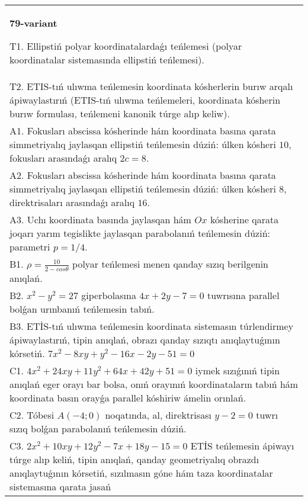 \documentclass{article}
\begin{document}
\begin{tabular}{m{17cm}}
\textbf{79-variant}
\newline

T1. Ellipstiń polyar koordinatalardaǵı teńlemesi (polyar koordinatalar sistemasında ellipstiń teńlemesi).\\

T2. ETIS-tıń ulıwma teńlemesin koordinata kósherlerin burıw arqalı ápiwaylastırıń (ETIS-tıń ulıwma teńlemeleri, koordinata kósherin burıw formulası, teńlemeni kanonik túrge alıp keliw).\\

A1. Fokusları abscissa kósherinde hám koordinata basına qarata simmetriyalıq jaylasqan ellipstiń teńlemesin dúziń: úlken kósheri $10$, fokusları arasındaǵı aralıq $2 c=8$.\\

A2. Fokusları abscissa kósherinde hám koordinata basına qarata simmetriyalıq jaylasqan ellipstiń teńlemesin dúziń: úlken kósheri $8$, direktrisaları arasındaǵı aralıq $16$.\\

A3. Uchı koordinata basında jaylasqan hám $Ox$ kósherine qarata joqarı yarım tegislikte jaylasqan parabolanıń teńlemesin dúziń: parametri $p=1/4$.\\

B1. $\rho = \frac{10}{2 - cos\theta}$ polyar teńlemesi menen qanday sızıq berilgenin anıqlań.  \\

B2. $x^{2} - y^{2} = 27$ giperbolasına $4x + 2y - 7 = 0$ tuwrısına parallel bolǵan urınbanıń teńlemesin tabıń.  \\

B3. ETİS-tıń ulıwma teńlemesin koordinata sistemasın túrlendirmey ápiwaylastırıń, tipin anıqlań, obrazı qanday sızıqtı anıqlaytuǵının kórsetiń. $7x^{2} - 8xy + y^{2} - 16x - 2y - 51 = 0$  \\

C1. $4x^{2} + 24xy + 11y^{2} + 64x + 42y + 51 = 0$ iymek sızıǵınıń tipin anıqlań eger orayı bar bolsa, onıń orayınıń koordinataların tabıń hám koordinata basın orayǵa parallel kóshiriw ámelin orınlań.  \\

C2. Tóbesi $A(-4;0)$ noqatında, al, direktrisası $y - 2 = 0$ tuwrı sızıq bolǵan parabolanıń teńlemesin dúziń.\\

C3. $2x^{2} + 10xy + 12y^{2} - 7x + 18y - 15 = 0$ ETİS teńlemesin ápiwayı túrge alıp keliń, tipin anıqlań, qanday geometriyalıq obrazdı anıqlaytuǵının kórsetiń, sızılmasın góne hám taza koordinatalar sistemasına qarata jasań  \\

\end{tabular}
\vspace{1cm}
\end{document}
